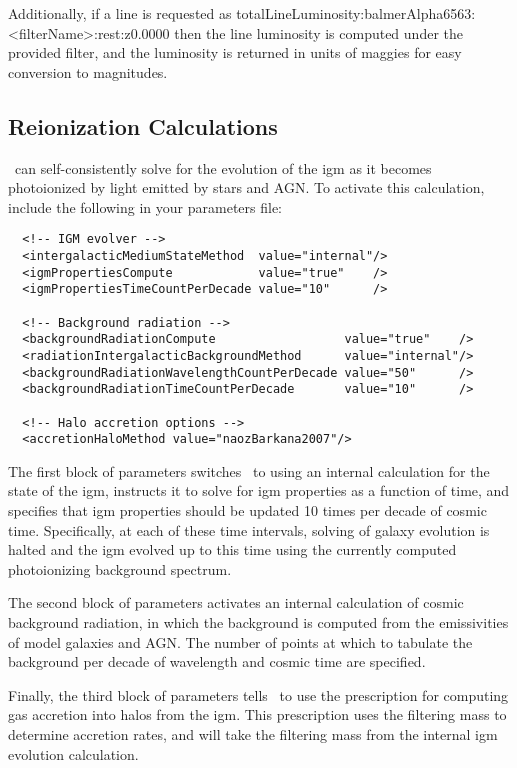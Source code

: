 Additionally, if a line is requested as {\normalfont \ttfamily totalLineLuminosity:balmerAlpha6563:<filterName>:rest:z0.0000} then the line luminosity is computed under the provided filter, and the luminosity is returned in units of \glspl{maggie} for easy conversion to magnitudes.

\subsection{Reionization Calculations}\label{sed:ReionziationTutorial}

\glc\ can self-consistently solve for the evolution of the \gls{igm} as it becomes photoionized by light emitted by stars and AGN. To activate this calculation, include the following in your parameters file:
\begin{verbatim}
  <!-- IGM evolver -->
  <intergalacticMediumStateMethod  value="internal"/>
  <igmPropertiesCompute            value="true"    />
  <igmPropertiesTimeCountPerDecade value="10"      />
  
  <!-- Background radiation -->
  <backgroundRadiationCompute                  value="true"    />
  <radiationIntergalacticBackgroundMethod      value="internal"/>
  <backgroundRadiationWavelengthCountPerDecade value="50"      />
  <backgroundRadiationTimeCountPerDecade       value="10"      />

  <!-- Halo accretion options -->
  <accretionHaloMethod value="naozBarkana2007"/>
\end{verbatim}
The first block of parameters switches \glc\ to using an internal calculation for the state of the \gls{igm}, instructs it to solve for \gls{igm} properties as a function of time, and specifies that \gls{igm} properties should be updated 10 times per decade of cosmic time. Specifically, at each of these time intervals, solving of galaxy evolution is halted and the \gls{igm} evolved up to this time using the currently computed photoionizing background spectrum.

The second block of parameters activates an internal calculation of cosmic background radiation, in which the background is computed from the emissivities of model galaxies and AGN. The number of points at which to tabulate the background per decade of wavelength and cosmic time are specified.

Finally, the third block of parameters tells \glc\ to use the \cite{naoz_formation_2007} prescription for computing gas accretion into halos from the \gls{igm}. This prescription uses the filtering mass to determine accretion rates, and will take the filtering mass from the internal \gls{igm} evolution calculation.

